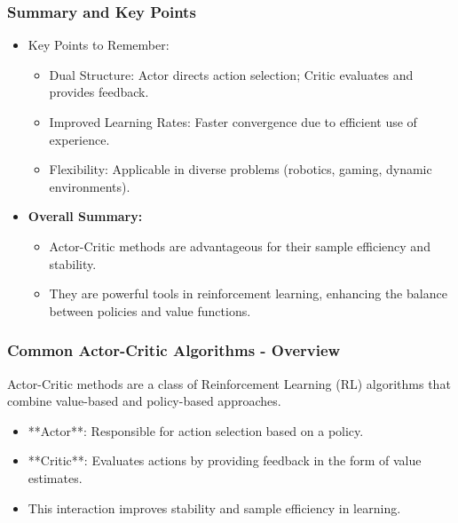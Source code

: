 \documentclass[aspectratio=169]{beamer}
\begin{document}
\begin{frame}[fragile]
    \frametitle{Summary and Key Points}
    \begin{itemize}
        \item Key Points to Remember:
        \begin{itemize}
            \item Dual Structure: Actor directs action selection; Critic evaluates and provides feedback.
            \item Improved Learning Rates: Faster convergence due to efficient use of experience.
            \item Flexibility: Applicable in diverse problems (robotics, gaming, dynamic environments).
        \end{itemize}
        
        \item \textbf{Overall Summary:}
        \begin{itemize}
            \item Actor-Critic methods are advantageous for their sample efficiency and stability.
            \item They are powerful tools in reinforcement learning, enhancing the balance between policies and value functions.
        \end{itemize}
    \end{itemize}
\end{frame}

\begin{frame}[fragile]
    \frametitle{Common Actor-Critic Algorithms - Overview}
    Actor-Critic methods are a class of Reinforcement Learning (RL) algorithms that combine value-based and policy-based approaches. 
    \begin{itemize}
        \item **Actor**: Responsible for action selection based on a policy.
        \item **Critic**: Evaluates actions by providing feedback in the form of value estimates.
        \item This interaction improves stability and sample efficiency in learning.
    \end{itemize}
\end{frame}
\end{document}
